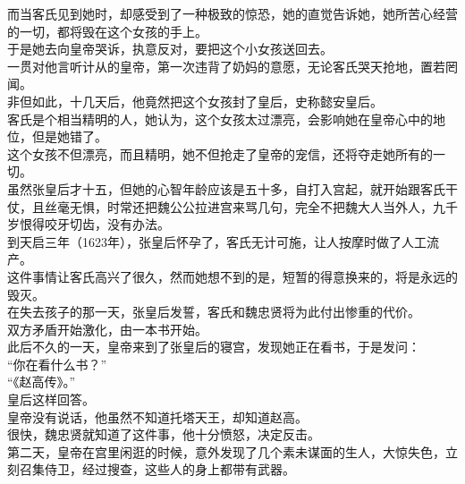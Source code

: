 \begin{multicols}{\theparacolNo}
而当客氏见到她时，却感受到了一种极致的惊恐，她的直觉告诉她，她所苦心经营的一切，都将毁在这个女孩的手上。\\

于是她去向皇帝哭诉，执意反对，要把这个小女孩送回去。\\

一贯对他言听计从的皇帝，第一次违背了奶妈的意愿，无论客氏哭天抢地，置若罔闻。\\

非但如此，十几天后，他竟然把这个女孩封了皇后，史称懿安皇后。\\

客氏是个相当精明的人，她认为，这个女孩太过漂亮，会影响她在皇帝心中的地位，但是她错了。\\

这个女孩不但漂亮，而且精明，她不但抢走了皇帝的宠信，还将夺走她所有的一切。\\

虽然张皇后才十五，但她的心智年龄应该是五十多，自打入宫起，就开始跟客氏干仗，且丝毫无惧，时常还把魏公公拉进宫来骂几句，完全不把魏大人当外人，九千岁恨得咬牙切齿，没有办法。\\

到天启三年（1623年），张皇后怀孕了，客氏无计可施，让人按摩时做了人工流产。\\

这件事情让客氏高兴了很久，然而她想不到的是，短暂的得意换来的，将是永远的毁灭。\\

在失去孩子的那一天，张皇后发誓，客氏和魏忠贤将为此付出惨重的代价。\\

双方矛盾开始激化，由一本书开始。\\

此后不久的一天，皇帝来到了张皇后的寝宫，发现她正在看书，于是发问：\\

“你在看什么书？”\\

“《赵高传》。”\\

皇后这样回答。\\

皇帝没有说话，他虽然不知道托塔天王，却知道赵高。\\

很快，魏忠贤就知道了这件事，他十分愤怒，决定反击。\\

第二天，皇帝在宫里闲逛的时候，意外发现了几个素未谋面的生人，大惊失色，立刻召集侍卫，经过搜查，这些人的身上都带有武器。\\


\end{multicols}
